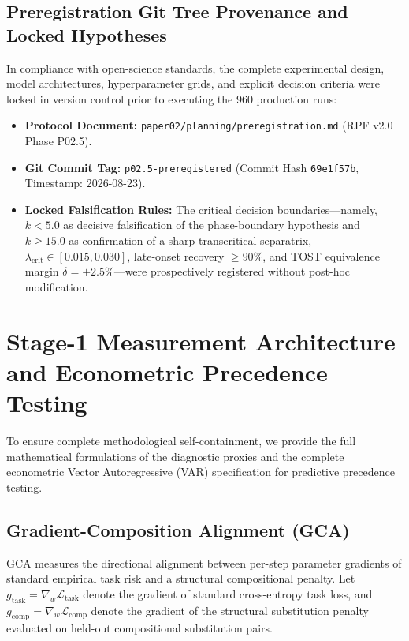 \documentclass{article}
\theoremstyle{plain}
\theoremstyle{definition}
\begin{document}
\subsection{Preregistration Git Tree Provenance and Locked Hypotheses}
\label{sec:app_preregistration_provenance}
In compliance with open-science standards, the complete experimental design, model architectures, hyperparameter grids, and explicit decision criteria were locked in version control prior to executing the 960 production runs:
\begin{itemize}[leftmargin=*,noitemsep]
    \item \textbf{Protocol Document:} \texttt{paper02/planning/preregistration.md} (RPF v2.0 Phase P02.5).
    \item \textbf{Git Commit Tag:} \texttt{p02.5-preregistered} (Commit Hash \texttt{69e1f57b}, Timestamp: 2026-08-23).
    \item \textbf{Locked Falsification Rules:} The critical decision boundaries---namely, $k < 5.0$ as decisive falsification of the phase-boundary hypothesis and $k \ge 15.0$ as confirmation of a sharp transcritical separatrix, $\lambda_{\text{crit}} \in [0.015, 0.030]$, late-onset recovery $\ge 90\%$, and TOST equivalence margin $\delta = \pm 2.5\%$---were prospectively registered without post-hoc modification.
\end{itemize}
\section{Stage-1 Measurement Architecture and Econometric Precedence Testing}
\label{sec:appendix_stage1_proxy}

To ensure complete methodological self-containment, we provide the full mathematical formulations of the diagnostic proxies and the complete econometric Vector Autoregressive (VAR) specification for predictive precedence testing.
\subsection{Gradient-Composition Alignment (GCA)}
GCA measures the directional alignment between per-step parameter gradients of standard empirical task risk and a structural compositional penalty. Let $g_{\text{task}} = \nabla_w \mathcal{L}_{\text{task}}$ denote the gradient of standard cross-entropy task loss, and $g_{\text{comp}} = \nabla_w \mathcal{L}_{\text{comp}}$ denote the gradient of the structural substitution penalty evaluated on held-out compositional substitution pairs.
\end{document}
